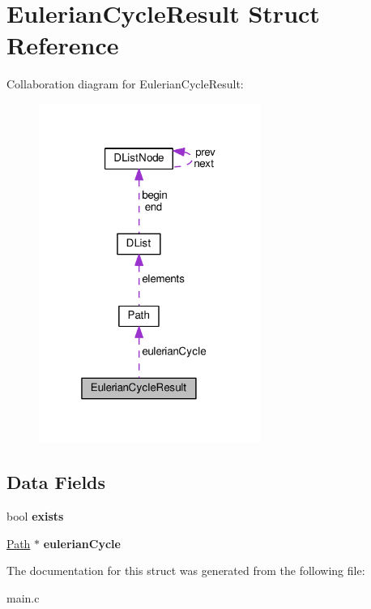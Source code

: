\hypertarget{structEulerianCycleResult}{}\section{Eulerian\+Cycle\+Result Struct Reference}
\label{structEulerianCycleResult}


Collaboration diagram for Eulerian\+Cycle\+Result\+:\nopagebreak
\begin{figure}[H]
\begin{center}
\leavevmode
\includegraphics[width=205pt]{structEulerianCycleResult__coll__graph}
\end{center}
\end{figure}
\subsection*{Data Fields}
\begin{DoxyCompactItemize}
\item 
bool {\bfseries exists}\hypertarget{structEulerianCycleResult_a669d96b44b92364e7beee4f0addc8713}{}\label{structEulerianCycleResult_a669d96b44b92364e7beee4f0addc8713}

\item 
\hyperlink{structPath}{Path} $\ast$ {\bfseries eulerian\+Cycle}\hypertarget{structEulerianCycleResult_ac6330c5f78f7c1be7f0666645064d986}{}\label{structEulerianCycleResult_ac6330c5f78f7c1be7f0666645064d986}

\end{DoxyCompactItemize}


The documentation for this struct was generated from the following file\+:\begin{DoxyCompactItemize}
\item 
main.\+c\end{DoxyCompactItemize}
